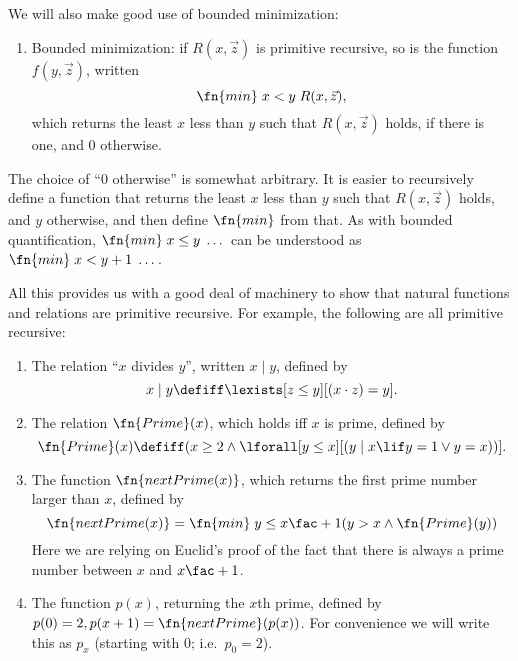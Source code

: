 \documentclass[../../include/open-logic-section]{subfiles}
\begin{document}
We will also make good use of bounded minimization:
\begin{enumerate}
\item Bounded minimization: if $R(x, \vec z)$ is primitive recursive,
  so is the function $f(y, \vec z)$, written 
\[
\fn{min} \; x < y \; R(x, \vec z),
\]
which returns the least $x$ less than $y$ such that $R(x,\vec z)$
holds, if there is one, and 0 otherwise.
\end{enumerate}

\begin{explain}
The choice of ``$0$ otherwise'' is somewhat arbitrary. It is easier to
recursively define a function that returns the least $x$ less than $y$
such that $R(x,\vec z)$ holds, and $y$ otherwise, and then define
$\fn{min}$ from that. As with bounded quantification, $\fn{min} \; x
\leq y \; \dots$ can be understood as $\fn{min} \; x < y + 1 \;
\dots$.
\end{explain}

All this provides us with a good deal of machinery to show that
natural functions and relations are primitive recursive. For example,
the following are all primitive recursive:
\begin{enumerate}
\item The relation ``$x$ divides $y$'', written $x \mid y$, defined by
\[
x \mid y \defiff \lexists[z \leq y][(x \cdot z) = y].
\]

\item The relation $\fn{Prime}(x)$, which holds iff $x$ is prime,
  defined by
\[
\fn{Prime}(x) \defiff (x \geq 2 \land \lforall[y \leq x][(y \mid x \lif y
  = 1 \lor y = x))].
\]
\item The function $\fn{nextPrime(x)}$, which returns the first prime
  number larger than $x$, defined by
\[
  \fn{nextPrime(x)} = \fn{min} \; {y \leq x\fac+1} \\ (y > x \land \fn{Prime}(y))
\]
Here we are relying on Euclid's proof of the fact that there is always
a prime number between $x$ and $x\fac+1$.

\item The function $p(x)$, returning the $x$th prime, defined by $p(0)
  = 2, p(x+1) = \fn{nextPrime}(p(x))$. For convenience we will write
  this as $p_x$ (starting with 0; i.e.\ $p_0=2$).
\end{enumerate}
\end{document}
